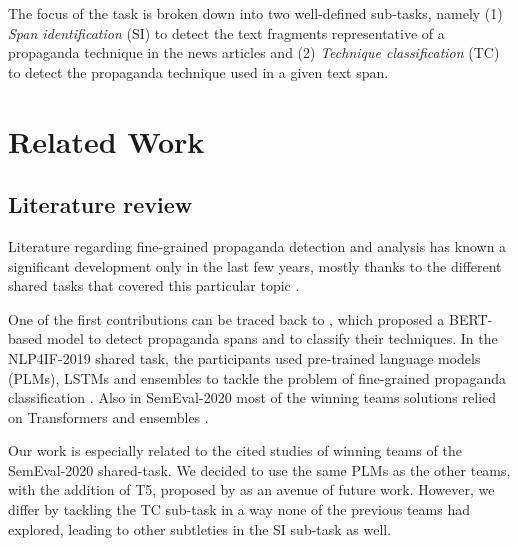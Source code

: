\documentclass[11pt]{article}
\newcommand{\pol}[1]{{\fontfamily{pcr}\selectfont#1}}
\begin{document}
The focus of the task is broken down into two well-defined sub-tasks, namely (1) \textit{Span identification} \pol{(SI)} to detect the text fragments representative of a propaganda technique in the news articles and (2) \textit{Technique classification} \pol{(TC)} to detect the propaganda technique used in a given text span.

\section{Related Work}
\subsection{Literature review}
Literature regarding fine-grained propaganda detection and analysis has known a significant development only in the last few years, mostly thanks to the different shared tasks that covered this particular topic \cite{da-san-martino-etal-2019-findings, finalsemeval}.

One of the first contributions can be traced back to \cite{da-san-martino-etal-2019-fine}, which proposed a \pol{BERT}-based model to detect propaganda spans and to classify their techniques.
In the NLP4IF-2019 shared task, the participants used pre-trained language models (\pol{PLM}s), LSTMs and ensembles to tackle the problem of fine-grained propaganda classification \cite{yoosuf-yang-2019-fine, vlad-etal-2019-sentence, tayyar-madabushi-etal-2019-cost}.
Also in SemEval-2020 most of the winning teams solutions relied on Transformers and ensembles \cite{aschern, morio-etal-2020-hitachi-semeval, dimov2020nopropaganda, jurkiewicz2020applicaai}.

Our work is especially related to the cited studies of winning teams of the SemEval-2020 shared-task. We decided to use the same \pol{PLM}s as the other teams, with the addition of \pol{T5}, proposed by \cite{aschern} as an avenue of future work. However, we differ by tackling the \pol{TC} sub-task in a way none of the previous teams had explored, leading to other subtleties in the \pol{SI} sub-task as well.
\end{document}
